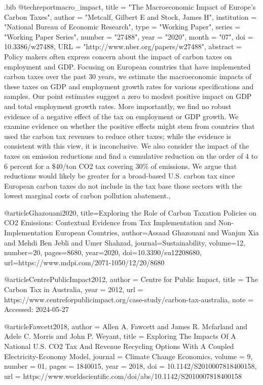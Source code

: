 \begin{filecontents}{.bib}
@techreport{macro_impact,
 title = "The Macroeconomic Impact of Europe’s Carbon Taxes",
 author = "Metcalf, Gilbert E and Stock, James H",
 institution = "National Bureau of Economic Research",
 type = "Working Paper",
 series = "Working Paper Series",
 number = "27488",
 year = "2020",
 month = "07",
 doi = {10.3386/w27488},
 URL = "http://www.nber.org/papers/w27488",
 abstract = {Policy makers often express concern about the impact of carbon taxes on employment and GDP. Focusing on European countries that have implemented carbon taxes over the past 30 years, we estimate the macroeconomic impacts of these taxes on GDP and employment growth rates for various specifications and samples.  Our point estimates suggest a zero to modest positive impact on GDP and total employment growth rates.  More importantly, we find no robust evidence of a negative effect of the tax on employment or GDP growth.  We examine evidence on whether the positive effects might stem from countries that used the carbon tax revenues to reduce other taxes; while the evidence is consistent with this view, it is inconclusive. We also consider the impact of the taxes on emission reductions and find a cumulative reduction on the order of 4 to 6 percent for a \$40/ton CO2 tax covering 30\% of emissions.  We argue that reductions would likely be greater for a broad-based U.S. carbon tax since European carbon taxes do not include in the tax base those sectors with the lowest marginal costs of carbon pollution abatement.},
}


@article{Ghazouani2020,
  title={Exploring the Role of Carbon Taxation Policies on CO2 Emissions: Contextual Evidence from Tax Implementation and Non-Implementation European Countries},
  author={Assaad Ghazouani and Wanjun Xia and Mehdi Ben Jebli and Umer Shahzad},
  journal={Sustainability},
  volume={12},
  number={20},
  pages={8680},
  year={2020},
  doi={10.3390/su12208680},
  url={https://www.mdpi.com/2071-1050/12/20/8680}
}


@article{CentrePublicImpact2012,
  author = {Centre for Public Impact},
  title = {The Carbon Tax in Australia},
  year = {2012},
  url = 
  {https://www.centreforpublicimpact.org/case-study/carbon-tax-australia},
  note = {Accessed: 2024-05-27}
}

@article{Fawcett2018,
  author = {Allen A. Fawcett and James R. Mcfarland and Adele C. Morris and John P. Weyant},
  title = {Exploring The Impacts Of A National U.S. CO2 Tax And Revenue Recycling Options With A Coupled Electricity-Economy Model},
  journal = {Climate Change Economics},
  volume = {9},
  number = {01},
  pages = {1840015},
  year = {2018},
  doi = {10.1142/S2010007818400158},
  url = {https://www.worldscientific.com/doi/abs/10.1142/S2010007818400158}
}



\end{filecontents}
